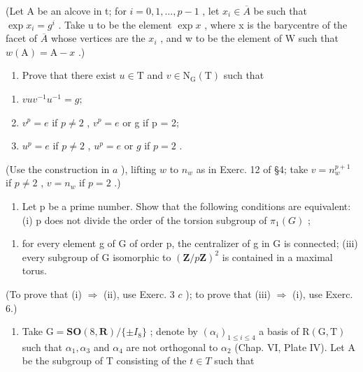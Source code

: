 \begin{enumerate}
(Let A be an alcove in t; for \(i = 0, 1, \ldots, p - 1\) , let \(x_i \in \overline{A}\) be such that \(\exp x_i = g^i\) . Take u to be the element \(\exp x\) , where x is the barycentre of the facet of \(\overline{A}\) whose vertices are the \(x_i\) , and w to be the element of W such that \(w(\mathrm{A}) = \mathrm{A} - x\) .)

\begin{enumerate}
\def\labelenumi{\alph{enumi})}
\setcounter{enumi}{1}
\tightlist
\item
  Prove that there exist \(u \in \mathrm{T}\) and \(v \in \mathrm{N}_{\mathrm{G}}(\mathrm{T})\) such that
\end{enumerate}

\begin{enumerate}
\def\labelenumi{(\roman{enumi})}
\item
  \(vuv^{-1}u^{-1}=g;\)
\item
  \(v^{p} = e\) if \(p \neq 2\) , \(v^{p} = e\) or g if p = 2;
\item
  \(u^{p} = e\) if \(p \neq 2\) , \(u^{p} = e\) or \(g\) if \(p = 2\) .
\end{enumerate}

(Use the construction in \(a\) ), lifting \(w\) to \(n_w\) as in Exerc. 12 of §4; take \(v = n_w^{p+1}\) if \(p \neq 2\) , \(v = n_w\) if \(p = 2\) .)

\begin{enumerate}
\def\labelenumi{\arabic{enumi})}
\setcounter{enumi}{6}
\tightlist
\item
  Let p be a prime number. Show that the following conditions are equivalent: (i) p does not divide the order of the torsion subgroup of \(\pi_{1}(G)\) ;
\end{enumerate}

\begin{enumerate}
\def\labelenumi{(\roman{enumi})}
\setcounter{enumi}{1}
\tightlist
\item
  for every element g of G of order p, the centralizer of g in G is connected; (iii) every subgroup of G isomorphic to \((\mathbf{Z}/p\mathbf{Z})^{2}\) is contained in a maximal torus.
\end{enumerate}

(To prove that (i) \(\Longrightarrow\) (ii), use Exerc. 3 \(c\) ); to prove that (iii) \(\Longrightarrow\) (i), use Exerc. 6.)

\begin{enumerate}
\def\labelenumi{\arabic{enumi})}
\setcounter{enumi}{7}
\tightlist
\item
  Take \(\mathrm{G} = \mathbf{SO}(8, \mathbf{R}) / \{\pm I_8\}\) ; denote by \((\alpha_i)_{1 \leq i \leq 4}\) a basis of \(\mathrm{R}(\mathrm{G}, \mathrm{T})\) such that \(\alpha_1, \alpha_3\) and \(\alpha_4\) are not orthogonal to \(\alpha_2\) (Chap. VI, Plate IV). Let A be the subgroup of T consisting of the \(t \in T\) such that
\end{enumerate}


\end{enumerate}
